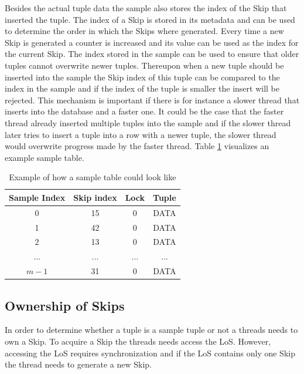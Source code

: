 \documentclass[sigconf,nonacm]{acmart}
\begin{document}
        Besides the actual tuple data the sample also stores the index of the Skip that inserted the tuple. The index of a Skip is stored in its metadata and can be used to determine the order in which the Skips where generated. Every time a new Skip is generated a counter is increased and its value can be used as the index for the current Skip.
        The index stored in the sample can be used to ensure that older tuples cannot overwrite newer tuples. Thereupon when a new tuple should be inserted into the sample the Skip index of this tuple can be compared to the index in the sample and if the index of the tuple is smaller the insert will be rejected. This mechanism is important if there is for instance a slower thread that inserts into the database and a faster one. It could be the case that the faster thread already inserted multiple tuples into the sample and if the slower thread later tries to insert a tuple into a row with a newer tuple, the slower thread would overwrite progress made by the faster thread. Table \ref{tab:sample} visualizes an example sample table.
        \begin{table}[h]
            \begin{tabular}{| c | c | c | c|} 
                \hline
                Sample Index & Skip index & Lock & Tuple \\
                \hline
                \hline
                0 & 15 & 0 & DATA \\
                \hline
                1 & 42 & 0 & DATA \\
                \hline
                2 & 13 & 0 & DATA \\
                \hline
                ... & ... & ... & ... \\
                \hline
                $m - 1$ & 31 & 0 & DATA \\
                \hline
            \end{tabular}
            \vspace{5mm}
            \caption{Example of how a sample table could look like}
            \label{tab:sample}
        \end{table}

    \subsection{Ownership of Skips}
        In order to determine whether a tuple is a sample tuple or not a threads needs to own a Skip. To acquire a Skip the threads needs access the LoS. However, accessing the LoS requires synchronization and if the LoS contains only one Skip the thread needs to generate a new Skip.
        
\end{document}
